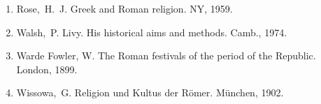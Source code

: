 \begin{flushleft}
\begin{enumerate}
\item Rose,~H.~J. Greek and Roman religion. NY, 1959.

\item Walsh,~P. Livy. His historical aims and methods. Camb., 1974.

\item Warde Fowler, W. The Roman festivals of the period of the Republic. London, 1899.

\item Wissowa,~G. Religion und Kultus der R\"{o}mer. M\"{u}nchen, 1902.

\end{enumerate}


\end{flushleft}
